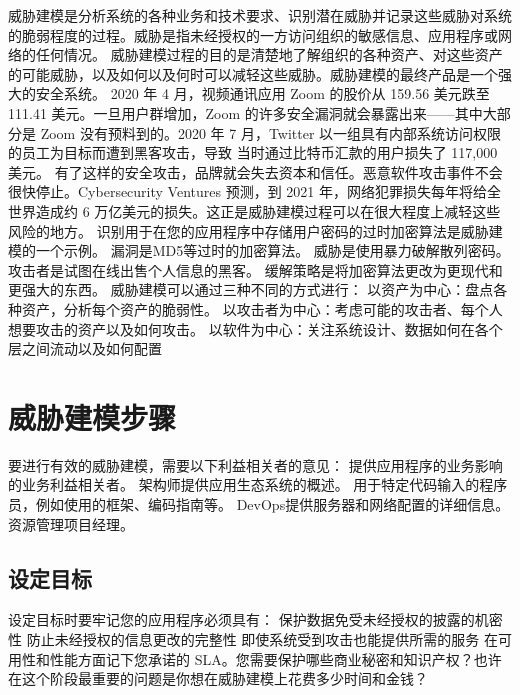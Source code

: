威胁建模是分析系统的各种业务和技术要求、识别潜在威胁并记录这些威胁对系统的脆弱程度的过程。威胁是指未经授权的一方访问组织的敏感信息、应用程序或网络的任何情况。 威胁建模过程的目的是清楚地了解组织的各种资产、对这些资产的可能威胁，以及如何以及何时可以减轻这些威胁。威胁建模的最终产品是一个强大的安全系统。 2020 年 4 月，视频通讯应用 Zoom 的股价从 159.56 美元跌至 111.41 美元。一旦用户群增加，Zoom 的许多安全漏洞就会暴露出来——其中大部分是 Zoom 没有预料到的。2020 年 7 月，Twitter 以一组具有内部系统访问权限的员工为目标而遭到黑客攻击，导致 当时通过比特币汇款的用户损失了 117,000 美元。 有了这样的安全攻击，品牌就会失去资本和信任。恶意软件攻击事件不会很快停止。Cyber​​security Ventures 预测，到 2021 年，网络犯罪损失每年将给全世界造成约 6 万亿美元的损失。这正是威胁建模过程可以在很大程度上减轻这些风险的地方。 
\newline
识别用于在您的应用程序中存储用户密码的过时加密算法是威胁建模的一个示例。 
\newline
漏洞是MD5等过时的加密算法。
\newline
威胁是使用暴力破解散列密码。
\newline
攻击者是试图在线出售个人信息的黑客。
\newline
缓解策略是将加密算法更改为更现代和更强大的东西。
\newline
威胁建模可以通过三种不同的方式进行： 
\newline
以资产为中心：盘点各种资产，分析每个资产的脆弱性。
\newline 
以攻击者为中心：考虑可能的攻击者、每个人想要攻击的资产以及如何攻击。
\newline
以软件为中心：关注系统设计、数据如何在各个层之间流动以及如何配置
\section{威胁建模步骤}
要进行有效的威胁建模，需要以下利益相关者的意见：
\newline
提供应用程序的业务影响的业务利益相关者。
\newline
架构师提供应用生态系统的概述。
\newline
用于特定代码输入的程序员，例如使用的框架、编码指南等。
\newline
DevOps提供服务器和网络配置的详细信息。
\newline
资源管理项目经理。

\subsection[]{设定目标}
设定目标时要牢记您的应用程序必须具有：
保护数据免受未经授权的披露的机密性
防止未经授权的信息更改的完整性
即使系统受到攻击也能提供所需的服务
在可用性和性能方面记下您承诺的 SLA。您需要保护哪些商业秘密和知识产权？也许在这个阶段最重要的问题是你想在威胁建模上花费多少时间和金钱？
